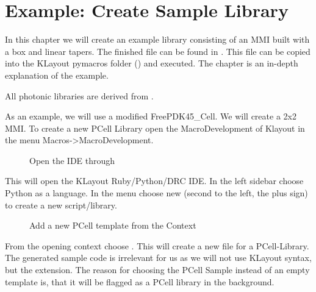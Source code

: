 \documentclass[a4paper,10pt,english]{sphinxmanual}
\begin{document}
\chapter{Example: Create Sample Library}
\label{\detokenize{example_library:example-create-sample-library}}\label{\detokenize{example_library::doc}}
In this chapter we will create an example library consisting of an MMI built with a box and linear tapers. The finished file can
be found in . This file can be copied into the KLayout pymacros folder () and executed. The chapter is an in-depth explanation of the example.

All photonic libraries are derived from {\hyperref[\detokenize{photonics:photonics.PhotDevice}]{}}.

As an example, we will use a modified FreePDK45\_Cell. We will create a 2x2 MMI.
To create a new PCell Library open the MacroDevelopment of Klayout in the menu Macros-\textgreater{}MacroDevelopment.

\begin{figure}[htbp]
\centering
\capstart

\noindent{}
\caption{Open the IDE through }\label{\detokenize{example_library:id1}}\end{figure}

This will open the KLayout Ruby/Python/DRC IDE. In the left sidebar choose Python as a language. In the menu choose
new (second to the left, the plus sign) to create a new script/library.

\begin{figure}[htbp]
\centering
\capstart

\noindent{}
\caption{Add a new PCell template from the Context}\label{\detokenize{example_library:id2}}\end{figure}

From the opening context choose . This will create a new  file for a PCell-Library.
The generated sample code is irrelevant for us as we will not use KLayout syntax, but the extension.
The reason for choosing the PCell Sample instead of an empty template is, that it will be flagged as a PCell library in
the background.
\end{document}
